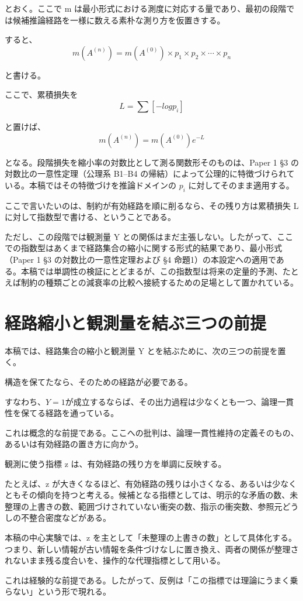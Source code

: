 \documentclass[12pt,a4paper]{article}
\begin{document}
とおく。ここで m は最小形式における測度に対応する量であり、最初の段階では候補推論経路を一様に数える素朴な測り方を仮置きする。

すると、 \[
m(A^{(n)}) = m(A^{(0)}) \times p_1 \times p_2 \times \cdots \times p_{n}
\]

と書ける。

ここで、累積損失を \[
L = \sum[-log p_{i}]
\]

と置けば、 \[
m(A^{(n)}) = m(A^{(0)}) e^{-L}
\]

となる。段階損失を縮小率の対数比として測る関数形そのものは、Paper 1 §3 の対数比の一意性定理（公理系 B1--B4 の帰結）によって公理的に特徴づけられている。本稿ではその特徴づけを推論ドメインの \(p_{i}\) に対してそのまま適用する。

ここで言いたいのは、制約が有効経路を順に削るなら、その残り方は累積損失 L に対して指数型で書ける、ということである。

ただし、この段階では観測量 Y との関係はまだ主張しない。したがって、ここでの指数型はあくまで経路集合の縮小に関する形式的結果であり、最小形式（Paper 1 §3 の対数比の一意性定理および §4 命題1）の本設定への適用である。本稿では単調性の検証にとどまるが、この指数型は将来の定量的予測、たとえば制約の種類ごとの減衰率の比較へ接続するための足場として置かれている。

\section{経路縮小と観測量を結ぶ三つの前提}\label{ux7d4cux8defux7e2eux5c0fux3068ux89b3ux6e2cux91cfux3092ux7d50ux3076ux4e09ux3064ux306eux524dux63d0}

本稿では、経路集合の縮小と観測量 Y とを結ぶために、次の三つの前提を置く。

\begin{assumption}[仮定A]
構造を保てたなら、そのための経路が必要である。

すなわち、$Y = 1$が成立するならば、その出力過程は少なくとも一つ、論理一貫性を保てる経路を通っている。

これは概念的な前提である。ここへの批判は、論理一貫性維持の定義そのもの、あるいは有効経路の置き方に向かう。
\end{assumption}

\begin{assumption}[仮定B]
観測に使う指標 z は、有効経路の残り方を単調に反映する。

たとえば、z が大きくなるほど、有効経路の残りは小さくなる、あるいは少なくともその傾向を持つと考える。候補となる指標としては、明示的な矛盾の数、未整理の上書きの数、範囲づけされていない衝突の数、指示の衝突数、参照元どうしの不整合密度などがある。

本稿の中心実験では、z を主として「未整理の上書きの数」として具体化する。つまり、新しい情報が古い情報を条件づけなしに置き換え、両者の関係が整理されないまま残る度合いを、操作的な代理指標として用いる。

これは経験的な前提である。したがって、反例は「この指標では理論にうまく乗らない」という形で現れる。
\end{assumption}
\end{document}
